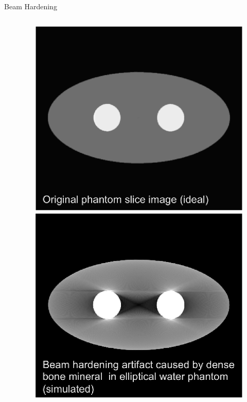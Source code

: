 \begin{frame}[c]{Beam Hardening}
\begin{columns}[c, onlytextwidth]
\begin{column}{0.6\textwidth}
\begin{itemize}
            \end{itemize}
            \vspace{-1.0cm}
        \end{column}\begin{column}{0.4\textwidth}
            \begin{figure}
                \includegraphics[height=0.45\textheight,clip=true,trim=0 0 0 30]{images/beam1.eps}\\
                \includegraphics[height=0.45\textheight,clip=true,trim=0 0 0 30]{images/beam2.eps}
            \end{figure}
        \end{column}
    \end{columns}
\end{frame}


